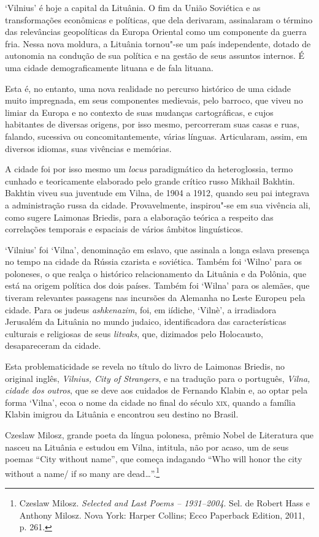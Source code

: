 `Vilnius' é hoje a capital da Lituânia. O fim da União Soviética e as
transformações econômicas e políticas, que dela derivaram, assinalaram o
término das relevâncias geopolíticas da Europa Oriental como um
componente da guerra fria. Nessa nova moldura, a Lituânia tornou"-se um
país independente, dotado de autonomia na condução de sua política e na
gestão de seus assuntos internos. É uma cidade demograficamente lituana
e de fala lituana.

Esta é, no entanto, uma nova realidade no percurso histórico de uma
cidade muito impregnada, em seus componentes medievais, pelo barroco,
que viveu no limiar da Europa e no contexto de suas mudanças
cartográficas, e cujos habitantes de diversas origens, por isso mesmo,
percorreram suas casas e ruas, falando, sucessiva ou concomitantemente,
várias línguas. Articularam, assim, em diversos idiomas, suas vivências
e memórias.

A cidade foi por isso mesmo um \emph{locus} paradigmático da
heteroglossia, termo cunhado e teoricamente elaborado pelo grande
crítico russo Mikhail Bakhtin. Bakhtin viveu sua juventude em Vilna, de
1904 a 1912, quando seu pai integrava a administração russa da cidade.
Provavelmente, inspirou"-se em sua vivência ali, como sugere Laimonas
Briedis, para a elaboração teórica a respeito das correlações temporais
e espaciais de vários âmbitos linguísticos.

`Vilnius' foi `Vilna', denominação em eslavo, que assinala a longa
eslava presença no tempo na cidade da Rússia czarista e soviética.
Também foi `Wilno' para os poloneses, o que realça o histórico
relacionamento da Lituânia e da Polônia, que está na origem política dos
dois países. Também foi `Wilna' para os alemães, que tiveram relevantes
passagens nas incursões da Alemanha no Leste Europeu pela cidade. Para
os judeus \emph{ashkenazim}, foi, em iídiche, `Vilnè', a irradiadora
Jerusalém da Lituânia no mundo judaico, identificadora das
características culturais e religiosas de seus \emph{litvaks}, que,
dizimados pelo Holocausto, desapareceram da cidade.

Esta problematicidade se revela no título do livro de Laimonas Briedis,
no original inglês, \emph{Vilnius, City of Strangers}, e na tradução
para o português, \emph{Vilna, cidade dos outros}, que se deve aos
cuidados de Fernando Klabin e, ao optar pela forma `Vilna', ecoa o nome
da cidade no final do século \textsc{xix}, quando a família Klabin imigrou da
Lituânia e encontrou seu destino no Brasil.

Czeslaw Milosz, grande poeta da língua polonesa, prêmio Nobel de
Literatura que nasceu na Lituânia e estudou em Vilna, intitula, não por
acaso, um de seus poemas ``City without name'', que começa indagando
``Who will honor the city without a name/ if so many are
dead\ldots{}''.\footnote{Czeslaw Milosz. \emph{Selected and Last Poems --
  1931--2004}. Sel. de Robert Hass e Anthony Milosz. Nova York: Harper
  Collins; Ecco Paperback Edition, 2011, p. 261.}

